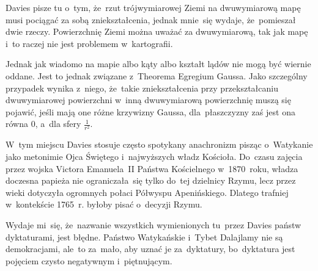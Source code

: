 \documentclass[a4paper,11pt]{article}
\begin{document}




\vspace{\spaceTwo} \vspace{\spaceThree}





\start {} Davies pisze tu o~tym, że~rzut trójwymiarowej Ziemi na
dwuwymiarową mapę musi pociągać za sobą zniekształcenia, jednak
mnie~się wydaje, że~pomieszał dwie rzeczy. Powierzchnię Ziemi można
uważać za dwuwymiarową, tak jak mapę i~to raczej nie jest problemem
w~kartografii.

Jednak jak wiadomo na mapie albo kąty albo kształt lądów nie mogą być
wiernie oddane. Jest to jednak związane z~Theorema Egregium Gaussa.
Jako szczególny przypadek wynika z~niego, że~takie zniekształcenia
przy przekształcaniu dwuwymiarowej powierzchni w~inną dwuwymiarową
powierzchnię muszą się pojawić, jeśli mają one różne krzywizny Gaussa,
dla~płaszczyzny zaś jest ona równa 0, a~dla sfery
$\frac{ 1 }{ r^{ 2 } }$.

\vspace{\spaceFour}


\start {} W~tym miejscu Davies stosuje często spotykany
anachronizm pisząc o~Watykanie jako metonimie Ojca Świętego
i~najwyższych władz Kościoła. Do~czasu zajęcia przez wojska Victora
Emanuela~II Państwa Kościelnego w~1870~roku, władza doczesna papieża
nie ograniczała~się tylko do~tej dzielnicy Rzymu, lecz przez wieki
dotyczyła ogromnych połaci Półwyspu Apenińskiego. Dlatego trafniej
w~kontekście 1765~r. byłoby pisać o~decyzji Rzymu.

\vspace{\spaceFour}


\start {} Wydaje mi~się, że~nazwanie wszystkich wymienionych
tu~przez Davies państw dyktaturami, jest błędne. Państwo Watykańskie
i~Tybet Dalajlamy nie są demokracjami, ale~to za~mało, aby uznać je
za~dyktatury, bo~dyktatura jest pojęciem czysto negatywnym
i~piętnującym.

\vspace{\spaceFour}
\end{document}
